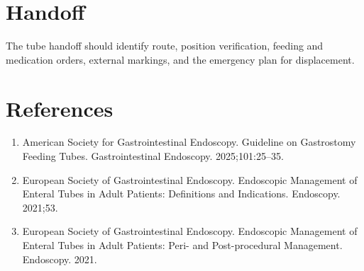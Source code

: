 \section*{Handoff}
The tube handoff should identify route, position verification, feeding and medication orders, external markings, and the emergency plan for displacement.

\section*{References}
\begin{enumerate}
  \item American Society for Gastrointestinal Endoscopy. Guideline on Gastrostomy Feeding Tubes. Gastrointestinal Endoscopy. 2025;101:25--35.
  \item European Society of Gastrointestinal Endoscopy. Endoscopic Management of Enteral Tubes in Adult Patients: Definitions and Indications. Endoscopy. 2021;53.
  \item European Society of Gastrointestinal Endoscopy. Endoscopic Management of Enteral Tubes in Adult Patients: Peri- and Post-procedural Management. Endoscopy. 2021.
\end{enumerate}

\clearpage
